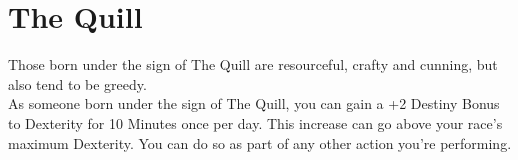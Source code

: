 \section{The Quill}\label{zodiac:quill}

Those born under the sign of The Quill are resourceful, crafty and cunning, but also tend to be greedy.\\
As someone born under the sign of The Quill, you can gain a +2 Destiny Bonus to Dexterity for 10 Minutes once per day.
This increase can go above your race's maximum Dexterity.
You can do so as part of any other action you're performing.\\